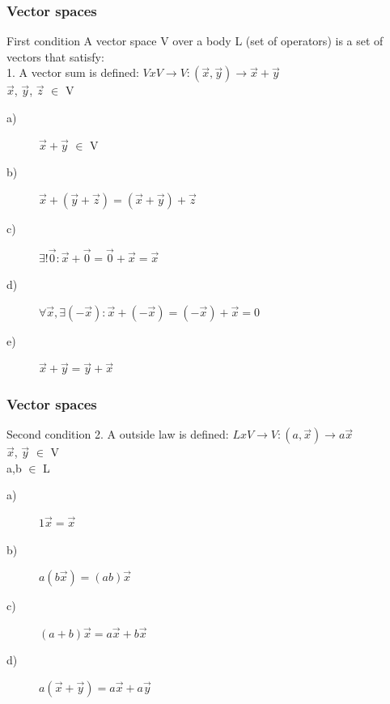 \begin{frame}
	\frametitle{Vector spaces}
	\begin{block}{First condition}
		A vector space V over a body L (set of operators) is a set of vectors that satisfy:\\
		1. A vector sum is defined: $VxV\rightarrow V:(\overrightarrow{x},\overrightarrow{y})\rightarrow\overrightarrow{x}+\overrightarrow{y}$\\
		 \hspace{1.5 cm}$\overrightarrow{x}$, $\overrightarrow{y}$, $\overrightarrow{z}$ $\in$ V
		\begin{description}
			\item[a)] $\overrightarrow{x}+\overrightarrow{y}$ $\in$ V
			\item[b)] $\overrightarrow{x}+(\overrightarrow{y}+\overrightarrow{z})=(\overrightarrow{x}+\overrightarrow{y})+\overrightarrow{z}$
			\item[c)] $\exists!\overrightarrow{0}: \overrightarrow{x}+\overrightarrow{0}=\overrightarrow{0}+\overrightarrow{x}=\overrightarrow{x}$
			\item[d)] $\forall \overrightarrow{x}, \exists (-\overrightarrow{x}):\overrightarrow{x}+(-\overrightarrow{x})=(-\overrightarrow{x})+\overrightarrow{x}=0$
			\item[e)] $\overrightarrow{x}+\overrightarrow{y}=\overrightarrow{y}+\overrightarrow{x}$
		\end{description}
	\end{block}
\end{frame}

\begin{frame}
	\frametitle{Vector spaces}
	\begin{block}{Second condition}
		2. A outside law is defined: $LxV\rightarrow V:(a,\overrightarrow{x})\rightarrow a\overrightarrow{x}$\\
		\hspace{1.5 cm}$\overrightarrow{x}$, $\overrightarrow{y}$ $\in$ V\\
		\hspace{1.5 cm}a,b $\in$ L
		\begin{description}
			\item[a)] $1\overrightarrow{x}=\overrightarrow{x}$
			\item[b)] $a(b\overrightarrow{x})=(ab)\overrightarrow{x}$
			\item[c)] $(a+b)\overrightarrow{x}=a\overrightarrow{x}+b\overrightarrow{x}$
			\item[d)] $a(\overrightarrow{x}+\overrightarrow{y})=a\overrightarrow{x}+a\overrightarrow{y}$
		\end{description}
	\end{block} 
\end{frame}

